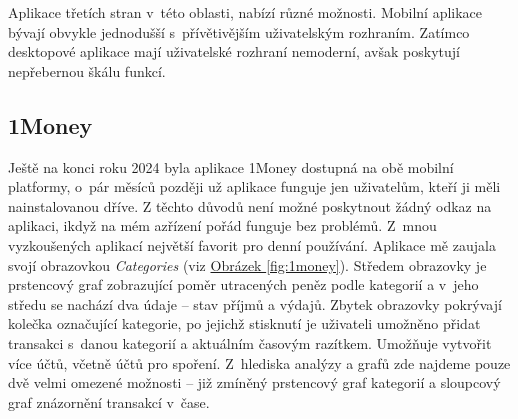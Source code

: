 \documentclass[
  biblatex,
  figures=true,
  tables=false,
  glossaries,
  index
]{kidiplom}
\begin{document}
Aplikace třetích stran v~této oblasti, nabízí různé možnosti. Mobilní aplikace bývají obvykle jednodušší s~přívětivějším uživatelským rozhraním. Zatímco desktopové aplikace mají uživatelské rozhraní nemoderní, avšak poskytují nepřebernou škálu funkcí.

\subsection{1Money}
Ještě na konci roku 2024 byla aplikace 1Money dostupná na obě mobilní platformy, o~pár měsíců později už aplikace funguje jen uživatelům, kteří ji měli nainstalovanou dříve. Z těchto důvodů není možné poskytnout žádný odkaz na aplikaci, ikdyž na mém azřízení pořád funguje bez problémů. Z~mnou vyzkoušených aplikací největší favorit pro denní používání. Aplikace mě zaujala svojí obrazovkou \textit{Categories} (viz \hyperref[fig:1money]{Obrázek \ref{fig:1money}}).  Středem obrazovky je prstencový graf zobrazující poměr utracených peněz podle kategorií a v~jeho středu se nachází dva údaje -- stav příjmů a výdajů. Zbytek obrazovky pokrývají kolečka označující kategorie, po jejichž stisknutí je uživateli umožněno přidat transakci s~danou kategorií a aktuálním časovým razítkem. Umožňuje vytvořit více účtů, včetně účtů pro spoření. Z~hlediska analýzy a grafů zde najdeme pouze dvě velmi omezené možnosti -- již zmíněný prstencový graf kategorií a sloupcový graf znázornění transakcí v~čase.
\end{document}

